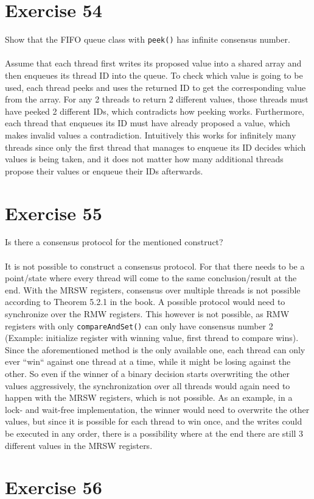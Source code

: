 \documentclass[a4paper,%
11pt,%
DIV=14,
headsepline,%
headings=normal,
]{scrartcl}
\newcommand{\exercise}[1]{\section*{Exercise #1}}
\begin{document}
\exercise{54}

Show that the FIFO queue class with \texttt{peek()} has infinite consensus number.\\
\\
Assume that each thread first writes its proposed value into a shared array and then enqueues its thread ID into the queue. To check which value is going to be used, each thread peeks and uses the returned ID to get the corresponding value from the array. For any 2 threads to return 2 different values, those threads must have peeked 2 different IDs, which contradicts how peeking works. Furthermore, each thread that enqueues its ID must have already proposed a value, which makes invalid values a contradiction. Intuitively this works for infinitely many threads since only the first thread that manages to enqueue its ID decides which values is being taken, and it does not matter how many additional threads propose their values or enqueue their IDs afterwards.

\exercise{55}


Is there a consensus protocol for the mentioned construct?\\
\\
It is not possible to construct a consensus protocol. For that there needs to be a point/state where every thread will come to the same conclusion/result at the end. With the MRSW registers, consensus over multiple threads is not possible according to Theorem 5.2.1 in the book. A possible protocol would need to synchronize over the RMW registers. This however is not possible, as RMW registers with only \texttt{compareAndSet()} can only have consensus number 2 (Example: initialize register with winning value, first thread to compare wins). Since the aforementioned method is the only available one, each thread can only ever ``win`` against one thread at a time, while it might be losing against the other. So even if the winner of a binary decision starts overwriting the other values aggressively, the synchronization over all threads would again need to happen with the MRSW registers, which is not possible. As an example, in a lock- and wait-free implementation, the winner would need to overwrite the other values, but since it is possible for each thread to win once, and the writes could be executed in any order, there is a possibility where at the end there are still 3 different values in the MRSW registers.

\exercise{56}
\end{document}
